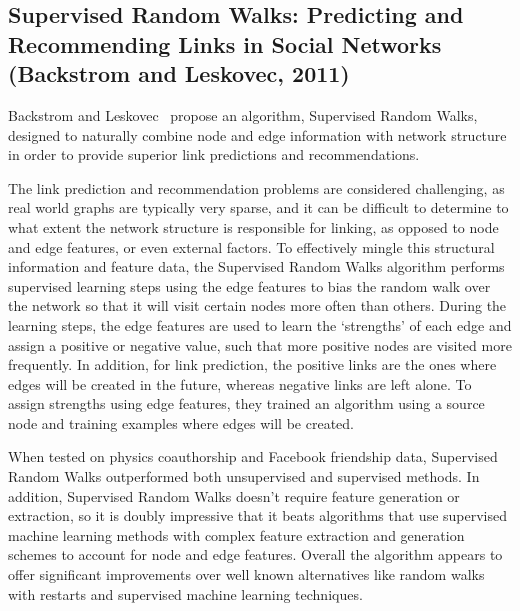 \subsection{Supervised Random Walks: Predicting and Recommending Links in Social Networks (Backstrom and Leskovec, 2011)}

Backstrom and Leskovec~\cite{Backstrom} propose an algorithm, Supervised Random
Walks, designed to naturally combine node and edge information with network
structure in order to provide superior link predictions and recommendations.

The link prediction and recommendation problems are considered challenging, as
real world graphs are typically very sparse, and it can be difficult to
determine to what extent the network structure is responsible for linking, as
opposed to node and edge features, or even external factors.  To effectively
mingle this structural information and feature data, the Supervised Random Walks
algorithm performs supervised learning steps using the edge features to bias the
random walk over the network so that it will  visit certain nodes more often
than others.  During the learning steps, the  edge features are used to learn
the `strengths' of each edge and assign a  positive or negative value, such that
more positive nodes are visited more  frequently.  In addition, for link
prediction, the positive links are the ones  where edges will be created in the
future, whereas negative links are left  alone.  To assign strengths using edge
features, they trained an algorithm  using a source node and training examples
where edges will be created.

When tested on physics coauthorship and Facebook friendship data, Supervised
Random Walks outperformed both unsupervised and supervised methods.  In
addition, Supervised Random Walks doesn't require feature generation or
extraction, so it is doubly impressive that it beats algorithms that use
supervised machine learning methods with complex feature extraction and
generation schemes to account for node and edge features. Overall the algorithm
appears to offer significant improvements over well known alternatives like
random walks with restarts and supervised machine learning techniques.
